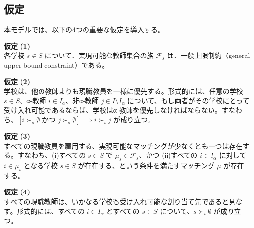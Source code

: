 \documentclass[12pt, a4paper]{article}
\theoremstyle{definition}
\theoremstyle{remark}
\theoremstyle{plain}
\begin{document}
\subsection{仮定}
本モデルでは、以下の4つの重要な仮定を導入する。

\vspace{0.5\baselineskip} %
\noindent\textbf{仮定 (1)} \\
各学校 $s \in S$ について、実現可能な教師集合の族 $\mathcal{F}_s$ は、一般上限制約（general upper-bound constraint）である。

\vspace{0.5\baselineskip}
\noindent\textbf{仮定 (2)} \\
学校は、他の教師よりも現職教員を一様に優先する。形式的には、任意の学校 $s \in S$、α-教師 $i \in I_\alpha$、非α-教師 $j \in I\setminus I_\alpha$ について、もし両者がその学校にとって受け入れ可能であるならば、学校はα-教師を優先しなければならない。すなわち、$[i \succ_s \emptyset \text{ かつ } j \succ_s \emptyset] \implies i \succ_s j$ が成り立つ。

\vspace{0.5\baselineskip}
\noindent\textbf{仮定 (3)} \\
すべての現職教員を雇用する、実現可能なマッチングが少なくとも一つは存在する。すなわち、(i)すべての $s \in S$ で $\mu_s \in \mathcal{F}_s$、かつ (ii)すべての $i \in I_\alpha$ に対して $i \in \mu_s$ となる学校 $s \in S$ が存在する、という条件を満たすマッチング $\mu$ が存在する。

\vspace{0.5\baselineskip}
\noindent\textbf{仮定 (4)} \\
すべての現職教師は、いかなる学校も受け入れ可能な割り当て先であると見なす。形式的には、すべての $i \in I_\alpha$ とすべての $s \in S$ について、$s \succ_i \emptyset$ が成り立つ。




\end{document}
